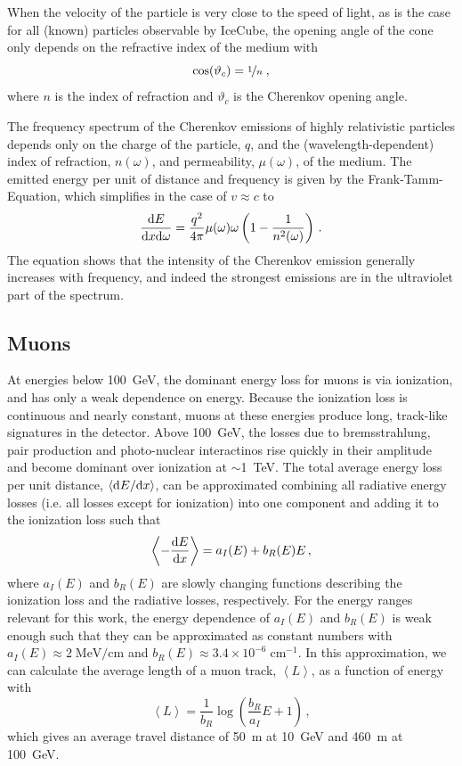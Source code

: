When the velocity of the particle is very close to the speed of light, as is the case for all (known) particles observable by IceCube, the opening angle of the cone only depends on the refractive index of the medium with
\begin{equation}
    \cos(\vartheta_c)=\nicefrac{1}{n}\;,
\end{equation}
where $n$ is the index of refraction and $\vartheta_c$ is the Cherenkov opening angle.

The frequency spectrum of the Cherenkov emissions of highly relativistic particles depends only on the charge of the particle, $q$, and the (wavelength-dependent) index of refraction, $n(\omega)$, and permeability, $\mu(\omega)$, of the medium. The emitted energy per unit of distance and frequency is given by the Frank-Tamm-Equation, which simplifies in the case of $v\approx c$ to 
\begin{equation}
    \frac{\mathrm{d} E}{\mathrm{d} x \mathrm{d} \omega}=\frac{q^2}{4\pi}\mu(\omega)\omega\left(1-\frac{1}{n^2(\omega)}\right)\,.
\end{equation}
The equation shows that the intensity of the Cherenkov emission generally increases with frequency, and indeed the strongest emissions are in the ultraviolet part of the spectrum.

\subsection{Muons}

At energies below 100~GeV, the dominant energy loss for muons is via ionization, and has only a weak dependence on energy. Because the ionization loss is continuous and nearly constant, muons at these energies produce long, track-like signatures in the detector. Above 100~GeV, the losses due to bremsstrahlung, pair production and photo-nuclear interactinos rise quickly in their amplitude and become dominant over ionization at $\sim$1~TeV. The total average energy loss per unit distance, $\left<\mathrm{d} E/\mathrm{d} x\right>$, can be approximated combining all radiative energy losses (i.e. all losses except for ionization) into one component and adding it to the ionization loss such that
\begin{equation}
    \left<-\frac{\mathrm{d} E}{\mathrm{d} x}\right> = a_I(E) + b_R(E)E\,,
\end{equation}
where $a_I(E)$ and $b_R(E)$ are slowly changing functions describing the ionization loss and the radiative losses, respectively\cite{muonstoppingpower}. For the energy ranges relevant for this work, the energy dependence of $a_I(E)$ and $b_R(E)$ is weak enough such that they can be approximated as constant numbers with $a_I(E)\approx 2\;\mathrm{MeV/cm}$ and $b_R(E)\approx3.4\times10^{-6}\;\mathrm{cm^{-1}}$\cite{muonstoppingpower}. In this approximation, we can calculate the average length of a muon track, $\left<L\right>$, as a function of energy with 
\begin{equation}
    \left<L\right>=\frac{1}{b_R}\log\left(\frac{b_R}{a_I}E + 1\right)\,,
\end{equation}
which gives an average travel distance of 50~m at 10~GeV and 460~m at 100~GeV.

